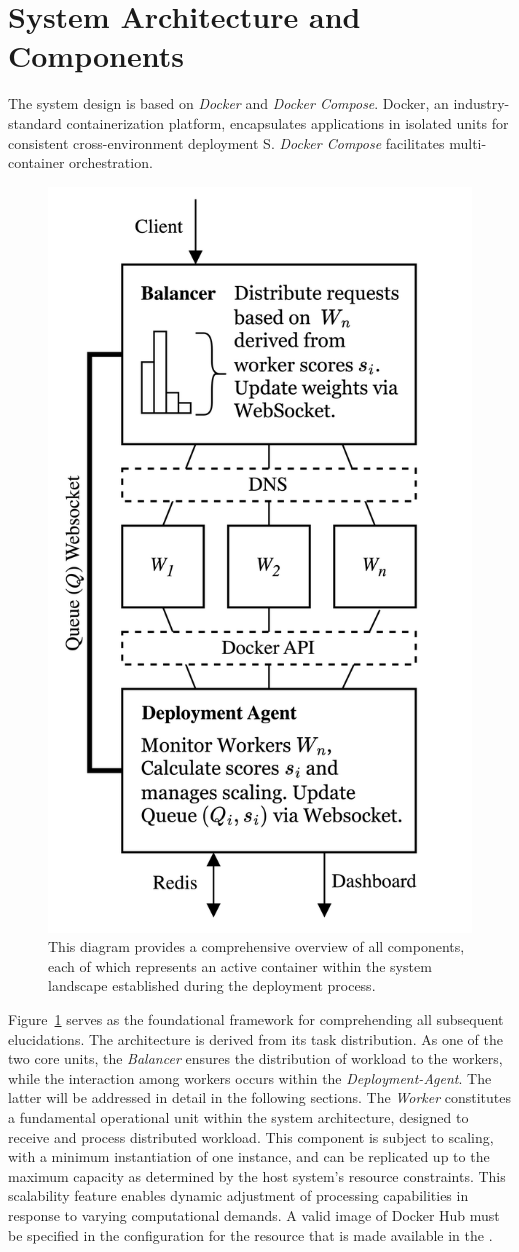 \documentclass[twocolumn]{webofc}
\begin{document}
\section{System Architecture and Components}
The system design is based on \textit{Docker} and \textit{Docker Compose}. Docker, an industry-standard containerization platform, encapsulates applications in isolated units for consistent cross-environment deployment {\color{red}S}. \textit{Docker Compose} facilitates multi-container orchestration.
\begin{figure}[H]
\centering
\includegraphics[width=0.701\columnwidth]{minimaloverview.png}
\caption{This diagram provides a comprehensive overview of all components, each of which represents an active container within the system landscape established during the deployment process.}
\label{fig:minimal}
\end{figure}
Figure~\ref{fig:minimal} serves as the foundational framework for comprehending all subsequent elucidations. The architecture is derived from its task distribution. As one of the two core units, the \textit{Balancer} ensures the distribution of workload to the workers, while the interaction among workers occurs within the \textit{Deployment-Agent}. The latter will be addressed in detail in the following sections. The \textit{Worker} constitutes a fundamental operational unit within the system architecture, designed to receive and process distributed workload. This component is subject to scaling, with a minimum instantiation of one instance, and can be replicated up to the maximum capacity as determined by the host system's resource constraints. This scalability feature enables dynamic adjustment of processing capabilities in response to varying computational demands. A valid image of Docker Hub must be specified in the configuration for the resource that is made available in the .
\end{document}
